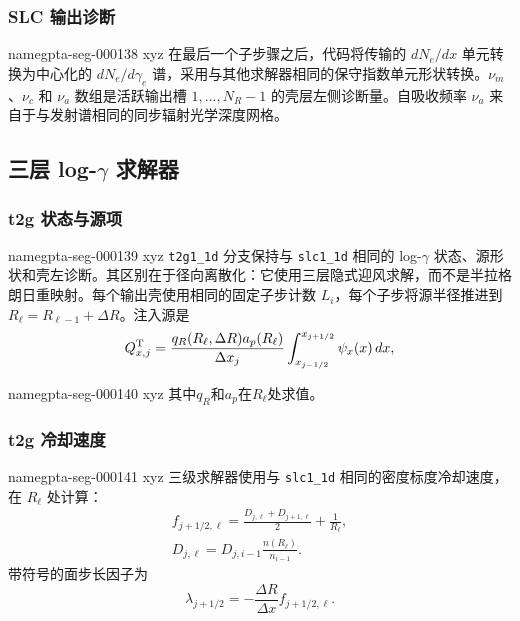 \documentclass[twocolumn]{aastex702}
\makeatletter
\providecommand{\gptareaderanchor}[1]{\pdfdest name{#1} xyz}%
\providecommand{\gptareaderanchor}[1]{\special{pdf:dest (#1) [ @thispage /XYZ @xpos @ypos null ]}}%
\makeatother
\begin{document}
\subsubsection{SLC 输出诊断}


\gptareaderanchor{gpta-seg-000138}%
在最后一个子步骤之后，代码将传输的 \(dN_e/dx\) 单元转换为中心化的 \(dN_e/d\gamma_e\) 谱，采用与其他求解器相同的保守指数单元形状转换。\(\nu_m\)、\(\nu_c\) 和 \(\nu_a\) 数组是活跃输出槽 \(1,\ldots,N_R-1\) 的壳层左侧诊断量。自吸收频率 \(\nu_a\) 来自于与发射谱相同的同步辐射光学深度网格。

\subsection{三层 log-\texorpdfstring{\(\gamma\)}{gamma} 求解器}

\subsubsection{t2g 状态与源项}


\gptareaderanchor{gpta-seg-000139}%
\texttt{t2g1\_1d} 分支保持与 \texttt{slc1\_1d} 相同的 log-\(\gamma\) 状态、源形状和壳左诊断。其区别在于径向离散化：它使用三层隐式迎风求解，而不是半拉格朗日重映射。每个输出壳使用相同的固定子步计数 \(L_i\)，每个子步将源半径推进到 \(R_\ell=R_{\ell-1}+\Delta R\)。注入源是
\begin{equation}
Q_{x,j}^{\rm T}=
\frac{q_R(R_\ell,\Delta R)a_p(R_\ell)}{\Delta x_j}
\int_{x_{j-1/2}}^{x_{j+1/2}}
\psi_x(x)\,dx ,
\end{equation}

\gptareaderanchor{gpta-seg-000140}%
其中\(q_R\)和\(a_p\)在\(R_\ell\)处求值。

\subsubsection{t2g 冷却速度}


\gptareaderanchor{gpta-seg-000141}%
三级求解器使用与 \texttt{slc1\_1d} 相同的密度标度冷却速度，在 \(R_\ell\) 处计算：
\begin{equation}
\begin{aligned}
f_{j+1/2,\ell}=
\frac{D_{j,\ell}+D_{j+1,\ell}}{2}+\frac{1}{R_\ell},\\
D_{j,\ell}=D_{j,i-1}\frac{n(R_\ell)}{n_{i-1}} .
\end{aligned}
\end{equation}
带符号的面步长因子为
\begin{equation}
\lambda_{j+1/2}=-\frac{\Delta R}{\Delta x}f_{j+1/2,\ell}.
\end{equation}
\end{document}
